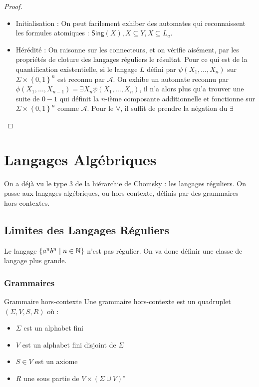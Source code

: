 \documentclass{cours}
\begin{document}
\begin{proof}
\begin{itemize}
        \begin{itemize}
            \item Initialisation : On peut facilement exhiber des automates qui reconnaissent les formules atomiques : $\textsf{Sing}(X), X \subseteq Y, X \subseteq L_{a}$.
            \item Hérédité : On raisonne sur les connecteurs, et on vérifie aisément, par les propriétés de cloture des langages réguliers le résultat. Pour ce qui est de la quantification existentielle, si le langage $L$ défini par $\psi(X_{1}, \ldots, X_{n})$ sur $\Sigma\times\left\{0, 1\right\}^{n}$ est reconnu par $\mathcal{A}$. On exhibe un automate reconnu par $\phi(X_{1}, \ldots, X_{n-1}) = \exists X_{n}\psi(X_{1}, \ldots, X_{n})$, il n'a alors plus qu'a trouver une suite de $0-1$ qui définit la $n$-ième composante additionnelle et fonctionne sur $\Sigma\times\left\{0, 1\right\}^{n}$ comme $\mathcal{A}$. Pour le $\forall$, il suffit de prendre la négation du $\exists$
        \end{itemize}
    \end{itemize}
\end{proof}

\section{Langages Algébriques}
On a déjà vu le type 3 de la hiérarchie de Chomsky : les langages réguliers. On passe aux langages algébriques, ou hors-contexte, définis par des grammaires hors-contextes.
\subsection{Limites des Langages Réguliers}
Le langage $\{a^{n}b^{n}\mid n\in \mathbb{N}\}$ n'est pas régulier. On va donc définir une classe de langage plus grande.

\subsubsection{Grammaires}
\begin{définition}{Grammaire hors-contexte}{}
    Une grammaire hors-contexte est un quadruplet $(\Sigma, V, S, R)$ où :
    \begin{itemize}
        \item $\Sigma$ est un alphabet fini
        \item $V$ est un alphabet fini disjoint de $\Sigma$
        \item $S\in V$ est un axiome
        \item $R$ une sous partie de $V \times (\Sigma \cup V)^{\star}$
    \end{itemize}    
\end{définition}
\end{document}
